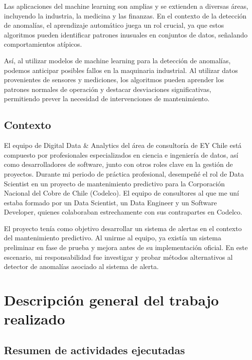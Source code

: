 \documentclass{article}[14pts]
\begin{document}
    Las aplicaciones del machine learning son amplias y se extienden a diversas áreas, incluyendo la industria, la 
    medicina y las finanzas. En el contexto de la detección de anomalías, el aprendizaje automático juega un rol 
    crucial, ya que estos algoritmos pueden identificar patrones inusuales en conjuntos de datos, señalando 
    comportamientos atípicos.

    Así, al utilizar modelos de machine learning para la detección de anomalías, podemos anticipar posibles fallos 
    en la maquinaria industrial. Al utilizar datos provenientes de sensores y mediciones, los algoritmos pueden 
    aprender los patrones normales de operación y destacar desviaciones significativas, permitiendo prever la 
    necesidad de intervenciones de mantenimiento. 

  \subsection{Contexto}

  El equipo de Digital Data \& Analytics del área de consultoría de EY Chile está compuesto por profesionales
  especializados en ciencia e ingeniería de datos, así como desarrolladores de software, junto con otros roles clave en la gestión de proyectos. Durante mi periodo de práctica profesional, desempeñé el rol de Data Scientist en un proyecto de mantenimiento predictivo para la Corporación Nacional del Cobre de Chile (Codelco). El equipo de consultores al que me uní estaba formado por un Data Scientist, un Data Engineer y un Software Developer, quienes colaboraban estrechamente con sus contrapartes en Codelco.

  El proyecto tenía como objetivo desarrollar un sistema de alertas en el contexto del mantenimiento predictivo. Al 
  unirme al equipo, ya existía un sistema preliminar en fase de prueba y mejora antes de su implementación oficial. En este escenario, mi responsabilidad fue investigar y probar métodos alternativos al detector de anomalías asociado al sistema de alerta.

\section{Descripción general del trabajo realizado}

  \subsection{Resumen de actividades ejecutadas}
\end{document}
